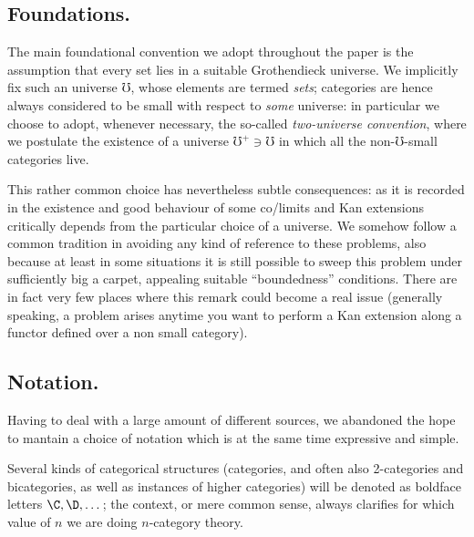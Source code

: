 
\subsection*{Foundations.} The main foundational convention we adopt throughout the paper is the assumption \cite{artin1972sga} that every set lies in a suitable Grothendieck universe. We implicitly fix such an universe $\mho$, whose elements are termed \emph{sets}; categories are hence always considered to be small with respect to \emph{some} universe: in particular we choose to adopt, whenever necessary, the so\hyp{}called \emph{two\hyp{}universe convention}, where we postulate the existence of a universe $\mho^+\ni \mho$ in which all the non-$\mho$\hyp{}small categories live. 

This rather common choice has nevertheless subtle consequences: as it is recorded in \cite{low2013universes} the existence and good behaviour of some co/limits and Kan extensions critically depends from the particular choice of a universe. We somehow follow a common tradition in avoiding any kind of reference to these problems, also because at least in some situations it is still possible to sweep this problem under sufficiently big a carpet, appealing suitable ``boundedness'' conditions. There are in fact very few places where this remark could become a real issue (generally speaking, a problem arises anytime you want to perform a Kan extension along a functor defined over a non small category).

\subsection*{Notation.} Having to deal with a large amount of different sources, we abandoned the hope to mantain a choice of notation which is at the same time expressive and simple.

Several kinds of categorical structures (categories, and often also 2\hyp{}categories and bicategories, as well as instances of higher categories) will be denoted as boldface letters $\C,\D,\dots$; the context, or mere common sense, always clarifies for which value of $n$ we are doing $n$\hyp{}category theory. 


